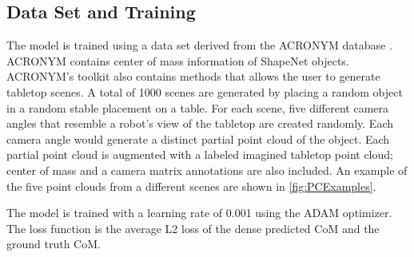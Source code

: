 \documentclass[12pt]{ucsddissertation}
\begin{document}
\subsection{Data Set and Training}
The model is trained using a data set derived from the ACRONYM database \cite{Eppner_Mousavian_Fox_2021}. ACRONYM contains center of mass information of ShapeNet \cite{chang2015shapenet} objects. ACRONYM's toolkit also contains methods that allows the user to generate tabletop scenes. A total of 1000 scenes are generated by placing a random object in a random stable placement on a table. For each scene, five different camera angles that resemble a robot's view of the tabletop are created randomly. Each camera angle would generate a distinct partial point cloud of the object. Each partial point cloud is augmented with a labeled imagined tabletop point cloud; center of mass and a camera matrix annotations are also included. An example of the five point clouds from a different scenes are shown in \ref{fig:PCExamples}.

The model is trained with a learning rate of 0.001 using the ADAM optimizer. The loss function is the average L2 loss of the dense predicted CoM and the ground truth CoM. 
\end{document}
